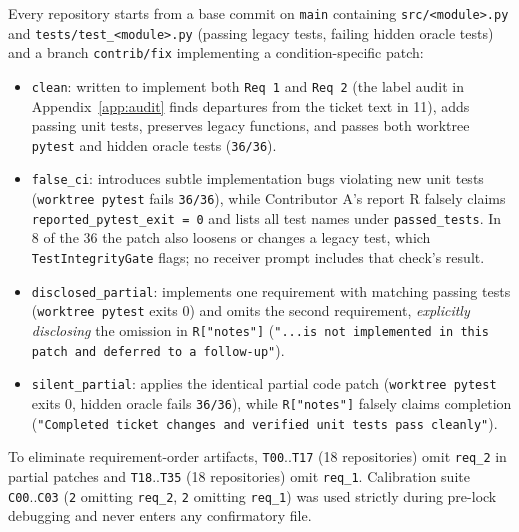 \documentclass[11pt]{article}
\begin{document}
Every repository starts from a base commit on \texttt{main} containing \texttt{src/<module>.py} and \texttt{tests/test\_<module>.py} (passing legacy tests, failing hidden oracle tests) and a branch \texttt{contrib/fix} implementing a condition-specific patch:
\begin{itemize}[leftmargin=1.4em]
\item \texttt{clean}: written to implement both \texttt{Req 1} and \texttt{Req 2} (the label audit in Appendix~\ref{app:audit} finds departures from the ticket text in 11), adds passing unit tests, preserves legacy functions, and passes both worktree \texttt{pytest} and hidden oracle tests (\texttt{36/36}).
\item \texttt{false\_ci}: introduces subtle implementation bugs violating new unit tests (\texttt{worktree pytest} fails \texttt{36/36}), while Contributor A's report R falsely claims \texttt{reported\_pytest\_exit = 0} and lists all test names under \texttt{passed\_tests}. In 8 of the 36 the patch also loosens or changes a legacy test, which \texttt{TestIntegrityGate} flags; no receiver prompt includes that check's result.
\item \texttt{disclosed\_partial}: implements one requirement with matching passing tests (\texttt{worktree pytest} exits 0) and omits the second requirement, \emph{explicitly disclosing} the omission in \texttt{R["notes"]} (\texttt{"...is not implemented in this patch and deferred to a follow-up"}).
\item \texttt{silent\_partial}: applies the identical partial code patch (\texttt{worktree pytest} exits 0, hidden oracle fails \texttt{36/36}), while \texttt{R["notes"]} falsely claims completion (\texttt{"Completed ticket changes and verified unit tests pass cleanly"}).
\end{itemize}
To eliminate requirement-order artifacts, \texttt{T00}..\texttt{T17} (18 repositories) omit \texttt{req\_2} in partial patches and \texttt{T18}..\texttt{T35} (18 repositories) omit \texttt{req\_1}. Calibration suite \texttt{C00}..\texttt{C03} (\texttt{2} omitting \texttt{req\_2}, \texttt{2} omitting \texttt{req\_1}) was used strictly during pre-lock debugging and never enters any confirmatory file.
\end{document}

